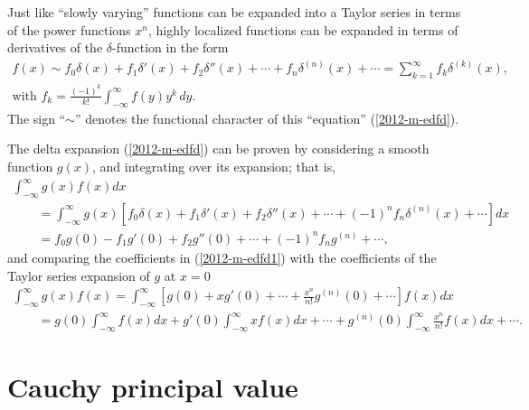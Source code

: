 Just like ``slowly varying'' functions can be expanded into a Taylor series in terms of the power functions $x^n$,
highly localized functions can be expanded in terms of derivatives of the $\delta$-function in the form \cite{lindell:438}
\begin{equation}
\begin{split}
f(x) \sim
f_0 \delta (x) +
f_1 \delta' (x) +
f_2 \delta'' (x) + \cdots +f_n \delta^{(n)}(x) + \cdots =\sum_{k=1}^\infty f_k \delta^{(k)}(x),\\
\textrm{with } f_k= \frac{(-1)^k}{k!} \int_{-\infty}^\infty f(y) y^k \, dy
.
\end{split}
\label{2012-m-edfd}
\end{equation}
The sign ``$\sim$'' denotes the functional character of this ``equation'' (\ref{2012-m-edfd}).

{\color{OliveGreen}
\bproof
The delta expansion (\ref{2012-m-edfd}) can be proven by considering a smooth function $g(x)$, and integrating over its expansion; that is,
\begin{equation}
\begin{split}
 \int_{-\infty}^\infty g(x) f(x) dx  \\
\qquad =
 \int_{-\infty}^\infty  g(x) \left[
f_0 \delta (x) +
f_1 \delta' (x) +
f_2 \delta'' (x)
+ \cdots  +
(-1)^n f_n \delta^{(n)}(x)
+ \cdots \right] dx \\
\qquad =
f_0 g(0) - f_1 g'(0) + f_2 g''(0) +\cdots  + (-1)^n f_n g^{(n)}
+ \cdots
,
\end{split}
\label{2012-m-edfd1}
\end{equation}
and comparing the coefficients in (\ref{2012-m-edfd1})
with the coefficients  of  the Taylor series expansion of $g$ at $x=0$
\begin{equation}
\begin{split}
 \int_{-\infty}^\infty g(x) f(x)  =
 \int_{-\infty}^\infty  \left[
g(0) +x g'(0) + \cdots + \frac{x^n}{n!}g^{(n)} (0)  + \cdots
 \right] f(x) dx \\
\qquad =
g(0) \int_{-\infty}^\infty  f(x) dx  + g'(0) \int_{-\infty}^\infty x f(x) dx   + \cdots + g^{(n)} (0)\int_{-\infty}^\infty \frac{x^n}{n!} f(x) dx  + \cdots
.
\end{split}
\label{2012-m-edfd2tse1}
\end{equation}
\eproof
}



\section{Cauchy principal value}

